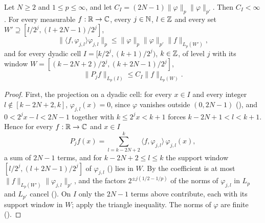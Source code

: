 \begin{proposition}
\label{prop:daub-proj-cell-bound}
\leanok
{}
Let $N \geq 2$ and $1 \leq p \leq \infty$, and let $C_I = (2N - 1) \|\varphi\|_p \|\varphi\|_{p'}$.
Then $C_I < \infty$. For every measurable $f : \mathbb{R} \to \mathbb{C}$, every $j \in \mathbb{N}$, $l \in \mathbb{Z}$ and
every set $W' \supseteq [l/2^j, (l + 2N - 1)/2^j]$,
\[
  \bigl\|\langle f, \varphi_{j,l} \rangle \varphi_{j,l}\bigr\|_p
  \leq \|\varphi\|_p \|\varphi\|_{p'} \|f\|_{L_p(W')} ,
\]
and for every dyadic cell $I = [k/2^j, (k+1)/2^j)$, $k \in \mathbb{Z}$, of level $j$ with its window
$W = [(k - 2N + 2)/2^j, (k + 2N - 1)/2^j]$,
\[
  \|P_j f\|_{L_p(I)} \leq C_I \|f\|_{L_p(W)} .
\]
\end{proposition}

\begin{proof}
\leanok
{}
First, the projection on a dyadic cell: for every $x \in I$ and every integer
$l \notin [k - 2N + 2, k]$, $\varphi_{j,l}(x) = 0$, since $\varphi$ vanishes outside
$(0, 2N - 1)$ (), and $0 < 2^j x - l < 2N - 1$ together with
$k \leq 2^j x < k + 1$ forces $k - 2N + 1 < l < k + 1$. Hence for every $f : \mathbb{R} \to \mathbb{C}$ and
$x \in I$
\[
  P_j f(x) = \sum_{l = k - 2N + 2}^{k} \langle f, \varphi_{j,l} \rangle \, \varphi_{j,l}(x) ,
\]
a sum of $2N - 1$ terms, and for $k - 2N + 2 \leq l \leq k$ the support window
$[l/2^j, (l + 2N - 1)/2^j]$ of $\varphi_{j,l}$ () lies in $W$.
By  the coefficient is at most
$\|f\|_{L_p(W')} \|\varphi_{j,l}\|_{p'}$, and the factors $2^{\pm j(1/2 - 1/p)}$ of the norms of
$\varphi_{j,l}$ in $L_p$ and $L_{p'}$ cancel (). On $I$ only the
$2N - 1$ terms above contribute, each with its support window in $W$; apply the triangle
inequality. The norms of $\varphi$ are finite ().
\end{proof}

